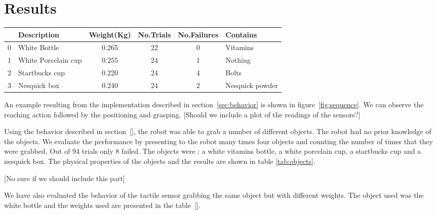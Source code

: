 \section{Results}
\label{sec:results}

\begin{table*}[tb]
  \caption{Objects} \label{tab:objects} \centering
  \begin{tabular}{|c|l|c|c|c|l|}
    \hline
    &Description& Weight(Kg)&No.Trials&No.Failures&Contains \\
    \hline
    0&White Bottle        & 0.265 & 22& 0 & Vitamins\\
    1&White Porcelain cup & 0.255 & 24& 1 & Nothing\\
    2&Startbucks cup      & 0.220 & 24& 4 & Bolts \\
    3&Nesquick box        & 0.240 & 24& 2 & Nesquick powder\\

    \hline
  \end{tabular}
\end{table*}


An example resulting from the implementation described in
section~\ref{sec:behavior} is shown in figure~\ref{fig:sequence}.
We can observe the reaching action followed by the positioning and
grasping. [Should we include a plot of the readings of the
sensors?]


Using the behavior described in section~\ref{}, the robot was able
to grab a number of different objects. The robot had no prior
knowledge of the objects. We evaluate the performance by
presenting to the robot many times four objects and counting the
number of times that they were grabbed. Out of 94 trials only 8
failed. The objects were : a white vitamins bottle, a white
porcelain cup, a startbucks cup and a nesquick box. The physical
properties of the objects and the results are shown in table
\ref{tab:objects}.

[No sure if we should include this part]

We have also evaluated the behavior of the tactile sensor grabbing
the same object but with different weights. The object used was
the white bottle and the weights used are presented in the
table~\ref{}.






